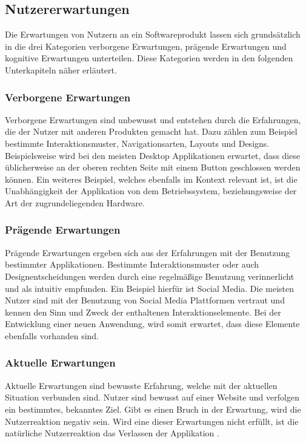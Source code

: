 \subsection{Nutzererwartungen}
Die Erwartungen von Nutzern an ein Softwareprodukt lassen sich grundsätzlich in die drei Kategorien verborgene Erwartungen, prägende Erwartungen und kognitive Erwartungen unterteilen.
Diese Kategorien werden in den folgenden Unterkapiteln näher erläutert.

\subsubsection{Verborgene Erwartungen}
Verborgene Erwartungen sind unbewusst und entstehen durch die Erfahrungen, die der Nutzer mit anderen Produkten gemacht hat.
Dazu zählen zum Beispiel bestimmte Interaktionsmuster, Navigationsarten, Layouts und Designs.
Beispielsweise wird bei den meisten Desktop Applikationen erwartet, dass diese üblicherweise an der oberen rechten Seite mit einem Button geschlossen werden können.
Ein weiteres Beispiel, welches ebenfalls im Kontext  relevant ist, ist die Unabhängigkeit der Applikation von dem Betriebssystem, beziehungsweise der Art der zugrundeliegenden Hardware.

\subsubsection{Prägende Erwartungen}
Prägende Erwartungen ergeben sich aus der Erfahrungen mit der Benutzung bestimmter Applikationen.
Bestimmte Interaktionsmuster oder auch Designentscheidungen werden durch eine regelmäßige Benutzung verinnerlicht und als intuitiv empfunden.
Ein Beispiel hierfür ist Social Media.
Die meisten Nutzer sind mit der Benutzung von Social Media Plattformen vertraut und kennen den Sinn und Zweck der enthaltenen Interaktionselemente.
Bei der Entwicklung einer neuen Anwendung, wird somit erwartet, dass diese Elemente ebenfalls vorhanden sind.

\subsubsection{Aktuelle Erwartungen}
Aktuelle Erwartungen sind bewusste Erfahrung, welche mit der aktuellen Situation verbunden sind.
Nutzer sind bewusst auf einer Website und verfolgen ein bestimmtes, bekanntes Ziel. Gibt es einen Bruch in der Erwartung, wird die Nutzerreaktion negativ sein. 
Wird eine dieser Erwartungen nicht erfüllt, ist die natürliche Nutzerreaktion das Verlassen der Applikation \autocite{noauthor_user_nodate}.

